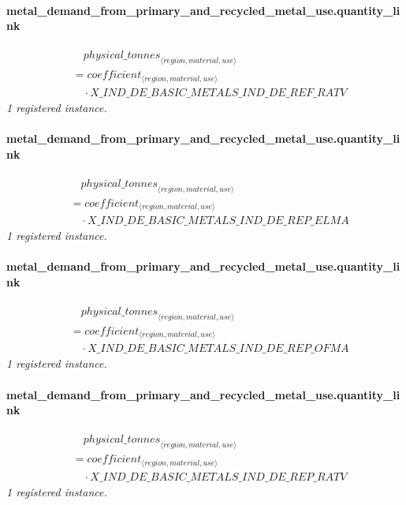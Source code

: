 \documentclass[11pt]{article}
\begin{document}
\paragraph{metal\_demand\_from\_primary\_and\_recycled\_metal\_use.quantity\_link}
\begin{align*}
&\quad {physical\_tonnes}_{\langle region, material, use\rangle}\\
&= coefficient_{\langle region, material, use\rangle}\\
&\quad {}\cdot X\_IND\_DE\_BASIC\_METALS\_IND\_DE\_REF\_RATV
\end{align*}
\noindent\emph{1 registered instance.}\par
\paragraph{metal\_demand\_from\_primary\_and\_recycled\_metal\_use.quantity\_link}
\begin{align*}
&\quad {physical\_tonnes}_{\langle region, material, use\rangle}\\
&= coefficient_{\langle region, material, use\rangle}\\
&\quad {}\cdot X\_IND\_DE\_BASIC\_METALS\_IND\_DE\_REP\_ELMA
\end{align*}
\noindent\emph{1 registered instance.}\par
\paragraph{metal\_demand\_from\_primary\_and\_recycled\_metal\_use.quantity\_link}
\begin{align*}
&\quad {physical\_tonnes}_{\langle region, material, use\rangle}\\
&= coefficient_{\langle region, material, use\rangle}\\
&\quad {}\cdot X\_IND\_DE\_BASIC\_METALS\_IND\_DE\_REP\_OFMA
\end{align*}
\noindent\emph{1 registered instance.}\par
\paragraph{metal\_demand\_from\_primary\_and\_recycled\_metal\_use.quantity\_link}
\begin{align*}
&\quad {physical\_tonnes}_{\langle region, material, use\rangle}\\
&= coefficient_{\langle region, material, use\rangle}\\
&\quad {}\cdot X\_IND\_DE\_BASIC\_METALS\_IND\_DE\_REP\_RATV
\end{align*}
\noindent\emph{1 registered instance.}\par
\end{document}
